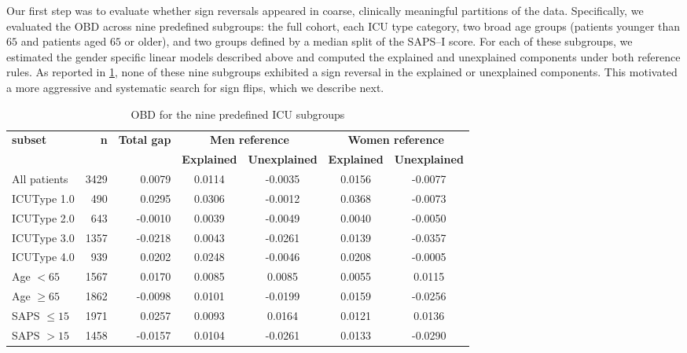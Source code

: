 Our first step was to evaluate whether sign reversals appeared in coarse, clinically meaningful partitions of the data. Specifically, we evaluated the OBD across nine predefined subgroups: the full cohort, each ICU type category, two broad age groups (patients younger than $65$ and patients aged $65$ or older), and two groups defined by a median split of the SAPS--I score. For each of these subgroups, we estimated the gender specific linear models described above and computed the explained and unexplained components under both reference rules. As reported in \cref{tab:A1_initial_subgroups}, none of these nine subgroups exhibited a sign reversal in the explained or unexplained components. This motivated a more aggressive and systematic search for sign flips, which we describe next.
\begin{table}[H]
    \centering
    \small
    \caption{OBD for the nine predefined ICU subgroups}
    \label{tab:A1_initial_subgroups}
    \begin{tabular}{l|r|r|cc|cc}
    \hline
    \textbf{subset} & \textbf{n} & \textbf{Total gap} 
        & \multicolumn{2}{c|}{\textbf{Men reference}} 
        & \multicolumn{2}{c}{\textbf{Women reference}} \\ 
    \cline{4-7}
      &   &   
      & \textbf{Explained} & \textbf{Unexplained} 
      & \textbf{Explained} & \textbf{Unexplained} \\ \hline
    All patients    & 3429 &  0.0079 &  0.0114 & -0.0035 &  0.0156 & -0.0077 \\ 
    ICUType 1.0     &  490 &  0.0295 &  0.0306 & -0.0012 &  0.0368 & -0.0073 \\ 
    ICUType 2.0     &  643 & -0.0010 &  0.0039 & -0.0049 &  0.0040 & -0.0050 \\ 
    ICUType 3.0     & 1357 & -0.0218 &  0.0043 & -0.0261 &  0.0139 & -0.0357 \\ 
    ICUType 4.0     &  939 &  0.0202 &  0.0248 & -0.0046 &  0.0208 & -0.0005 \\ 
    Age $< 65$      & 1567 &  0.0170 &  0.0085 &  0.0085 &  0.0055 &  0.0115 \\ 
    Age $\ge 65$    & 1862 & -0.0098 &  0.0101 & -0.0199 &  0.0159 & -0.0256 \\ 
    SAPS $\le 15$   & 1971 &  0.0257 &  0.0093 &  0.0164 &  0.0121 &  0.0136 \\ 
    SAPS $> 15$     & 1458 & -0.0157 &  0.0104 & -0.0261 &  0.0133 & -0.0290 \\ \hline
    \end{tabular}
\end{table}


